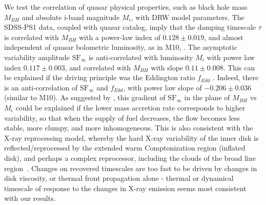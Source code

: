 \documentclass[twocolumn]{aastex62}
\begin{document}
We test the correlation of quasar physical properties, such as black hole mass $M_{BH}$ and absolute i-band magnitude $M_{i}$,  with DRW model parameters. The SDSS-PS1 data, coupled with \citep{shen2011} quasar catalog, imply that the damping timescale $\tau$  is correlated with $M_{BH}$ with a power-law index of $0.128 \pm 0.019$, and almost independent of quasar bolometric luminosity, as in M10, \citet{wilhite2008, vandenberk2004}. The asymptotic variability amplitude $\mathrm{SF}_{\infty}$ is anti-correlated with luminosity $M_{i}$ with power law index $0.117\pm0.003$, and correlated with $M_{BH}$ with slope $0.11\pm 0.008$. This can be explained if the driving principle was the Eddington ratio $f_{Edd}$ \cite{wilhite2008}. Indeed, there is an anti-correlation of $\mathrm{SF}_{\infty}$ and $f_{Edd}$, with power law slope of $-0.206 \pm 0.036$ (similar to M10).  As suggested by \citet{kubota2018}, this gradient of $\mathrm{SF}_{\infty}$ in the plane of $M_{BH}$ vs $M_{i}$ could be explained if the lower mass accretion rate corresponds to higher variability, so that when the supply of fuel decreases, the flow becomes less stable, more clumpy, and more inhomogeneous\citep{rakshit2017, kokubo2015, dexter2011}.  This is also consistent with the X-ray reprocessing model, whereby the hard X-ray variability of the inner disk is reflected/reprocessed by the extended warm Comptonization region (inflated disk), and perhaps a complex reprocessor, including the clouds of the broad line region~\citep{kubota2018, panda2019b}. Changes on recovered timescales are too fast to be driven by changes in disk viscosity, or thermal front propagation alone - thermal or dynamical timescale of response to the changes in X-ray emission seems most consistent with our results\cite{stern2018}.



\end{document}
